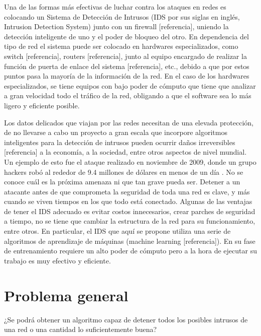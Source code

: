 Una de las formas más efectivas de luchar contra los ataques en redes es colocando un Sistema de Detección de Intrusos \cite{scarfone2012guide} (IDS por sus siglas en inglés, Intrusion Detection System) junto con un firewall [referencia], uniendo la detección inteligente de uno y el poder de bloqueo del otro. En dependencia del tipo de red el sistema puede ser colocado en hardwares especializados, como switch [referencia], routers [referencia], junto al equipo encargado de realizar la función de puerta de enlace del sistema [referencia],  etc., debido a que por estos puntos pasa la mayoría de la información de la red. En el caso de los hardwares especializados, se tiene equipos con bajo poder de cómputo que tiene que analizar a gran velocidad todo el tráfico de la red, obligando a que el software sea lo más ligero y eficiente posible.

Los datos delicados que viajan por las redes necesitan de una elevada protección, de no llevarse a cabo un proyecto a gran escala que incorpore algoritmos inteligentes para la detección de intrusos pueden ocurrir daños irreversibles [referencia] a la economía, a la sociedad, entre otros aspectos de nivel mundial. Un ejemplo de esto fue el ataque realizado en noviembre de 2009, donde un grupo hackers robó al rededor de 9.4 millones de dólares en menos de un día \cite{harper2011gray}. No se conoce cuál es la próxima amenaza ni que tan grave pueda ser. Detener a un atacante antes de que comprometa la seguridad de toda una red es clave, y más cuando se viven tiempos en los que todo está conectado. Algunas de las ventajas de tener el IDS adecuado es evitar costos innecesarios, crear parches de seguridad a tiempo, no se tiene que cambiar la estructura de la red para su funcionamiento, entre otros. En particular, el IDS que aquí se propone utiliza una serie de algoritmos de aprendizaje de máquinas (machine learning [referencia]). En su fase de entrenamiento requiere un alto poder de cómputo pero a la hora de ejecutar su trabajo es muy efectivo y eficiente.

\section*{Problema general}
¿Se podrá obtener un algoritmo capaz de detener todos los posibles intrusos de una red o una cantidad lo suficientemente buena?

